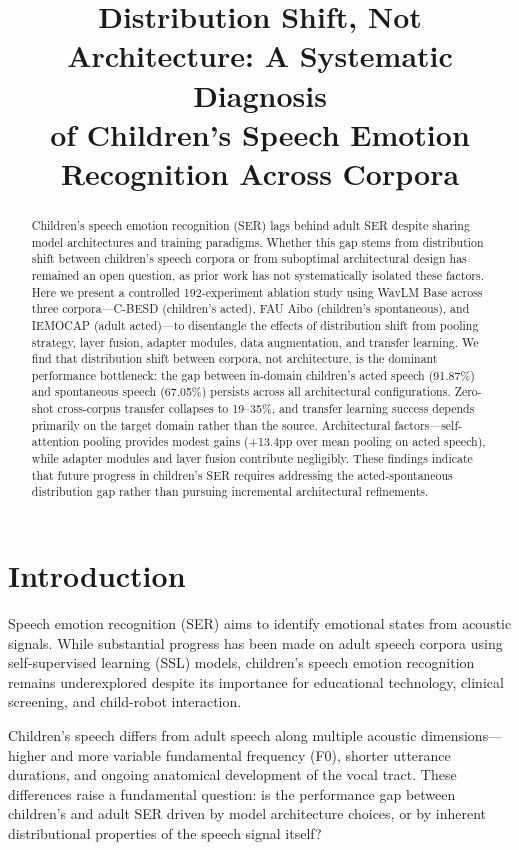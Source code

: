 \documentclass[11pt,a4paper]{article}
\begin{document}
\title{Distribution Shift, Not Architecture: A Systematic Diagnosis\\of Children's Speech Emotion Recognition Across Corpora}
\date{}
\maketitle

\begin{abstract}
Children's speech emotion recognition (SER) lags behind adult SER despite sharing model architectures and training paradigms. Whether this gap stems from distribution shift between children's speech corpora or from suboptimal architectural design has remained an open question, as prior work has not systematically isolated these factors. Here we present a controlled 192-experiment ablation study using WavLM Base across three corpora---C-BESD (children's acted), FAU Aibo (children's spontaneous), and IEMOCAP (adult acted)---to disentangle the effects of distribution shift from pooling strategy, layer fusion, adapter modules, data augmentation, and transfer learning. We find that distribution shift between corpora, not architecture, is the dominant performance bottleneck: the gap between in-domain children's acted speech (91.87\%) and spontaneous speech (67.05\%) persists across all architectural configurations. Zero-shot cross-corpus transfer collapses to 19--35\%, and transfer learning success depends primarily on the target domain rather than the source. Architectural factors---self-attention pooling provides modest gains (+13.4pp over mean pooling on acted speech), while adapter modules and layer fusion contribute negligibly. These findings indicate that future progress in children's SER requires addressing the acted-spontaneous distribution gap rather than pursuing incremental architectural refinements.
\end{abstract}

\section{Introduction}

Speech emotion recognition (SER) aims to identify emotional states from acoustic signals. While substantial progress has been made on adult speech corpora using self-supervised learning (SSL) models, children's speech emotion recognition remains underexplored despite its importance for educational technology, clinical screening, and child-robot interaction.

Children's speech differs from adult speech along multiple acoustic dimensions---higher and more variable fundamental frequency (F0), shorter utterance durations, and ongoing anatomical development of the vocal tract. These differences raise a fundamental question: is the performance gap between children's and adult SER driven by model architecture choices, or by inherent distributional properties of the speech signal itself?
\end{document}
